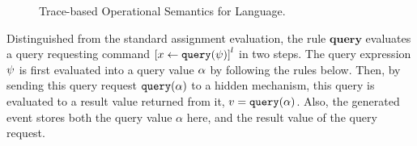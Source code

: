 \begin{figure}
\begin{mathpar}
\end{mathpar}
    \caption{Trace-based Operational Semantics for Language.}
    \label{fig:os}
\end{figure}

Distinguished from the standard assignment evaluation, 
the rule $\textbf{query}$ 
evaluates a query requesting command $\clabel{\assign{x}{\query(\qexpr)}}^l$ in two steps.
The query expression $\qexpr$ is first evaluated into a query value $\qval$ by following the rules below.
Then, by sending this query request $\query(\qval)$  to a hidden mechanism, this query is evaluated to a result value returned from it, $v = \query(\qval)$.
Also, the generated event stores both the query value $\alpha$ here, and the result value of the query request.

